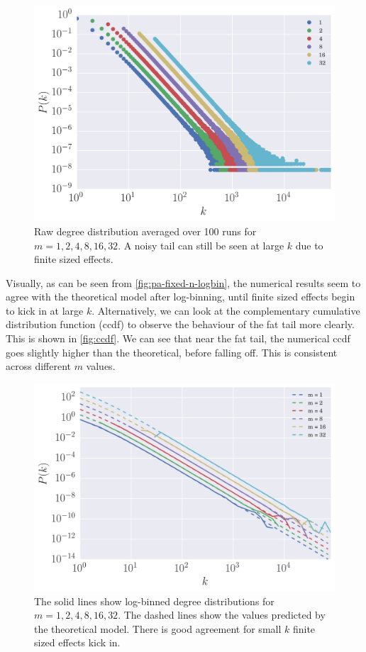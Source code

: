 \begin{figure}
    \centering
    \includegraphics[height=0.5\linewidth]{img/pa-fixed-n-degree-dist}
    \caption{Raw degree distribution averaged over 100 runs for $m = 1, 2, 4, 8, 16, 32$. A noisy tail can still be seen at large $k$ due to finite sized effects. }
    \label{fig:pa-fixed-n-degree-dist}
\end{figure}

Visually, as can be seen from \autoref{fig:pa-fixed-n-logbin}, the numerical results seem to agree with the theoretical model after log-binning, until finite sized effects begin to kick in at large $k$. Alternatively, we can look at the complementary cumulative distribution function (ccdf) to observe the behaviour of the fat tail more clearly. This is shown in \autoref{fig:ccdf}. We can see that near the fat tail, the numerical ccdf goes slightly higher than the theoretical, before falling off. This is consistent across different $m$ values.

\begin{figure}
    \centering
    \includegraphics[height=0.5\linewidth]{img/pa-fixed-n-logbin}
    \caption{The solid lines show log-binned degree distributions for $m = 1, 2, 4, 8, 16, 32$. The dashed lines show the values predicted by the theoretical model. There is good agreement for small $k$ finite sized effects kick in. }
    \label{fig:pa-fixed-n-logbin}
\end{figure}

